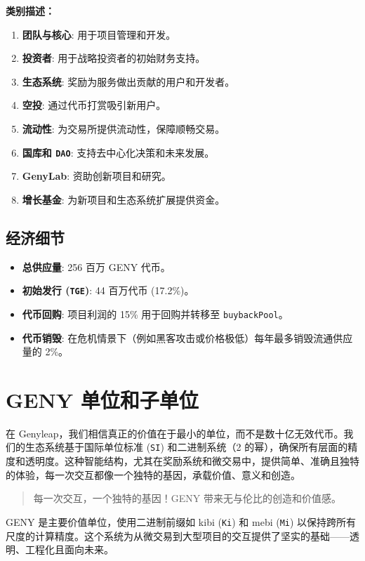 \documentclass[a4paper,12pt,openany]{book}
\begin{document}
\textbf{类别描述：}
\begin{enumerate}
    \item \textbf{团队与核心}: 用于项目管理和开发。
    \item \textbf{投资者}: 用于战略投资者的初始财务支持。
    \item \textbf{生态系统}: 奖励为服务做出贡献的用户和开发者。
    \item \textbf{空投}: 通过代币打赏吸引新用户。
    \item \textbf{流动性}: 为交易所提供流动性，保障顺畅交易。
    \item \textbf{国库和 \texttt{DAO}}: 支持去中心化决策和未来发展。
    \item \textbf{GenyLab}: 资助创新项目和研究。
    \item \textbf{增长基金}: 为新项目和生态系统扩展提供资金。
\end{enumerate}

\subsection*{经济细节}
\begin{itemize}
    \item \textbf{总供应量}: 256 百万 GENY 代币。
    \item \textbf{初始发行 (\texttt{TGE})}: 44 百万代币 (17.2\%)。
    \item \textbf{代币回购}: 项目利润的 15\% 用于回购并转移至 \texttt{buybackPool}。
    \item \textbf{代币销毁}: 在危机情景下（例如黑客攻击或价格极低）每年最多销毁流通供应量的 2\%。
\end{itemize}
\newpage

\section*{GENY 单位和子单位}
在 Genyleap，我们相信真正的价值在于最小的单位，而不是数十亿无效代币。我们的生态系统基于国际单位标准 (\texttt{SI}) 和二进制系统（2 的幂），确保所有层面的精度和透明度。这种智能结构，尤其在奖励系统和微交易中，提供简单、准确且独特的体验，每一次交互都像一个独特的基因，承载价值、意义和创造。
\begin{quote}
每一次交互，一个独特的基因！GENY 带来无与伦比的创造和价值感。
\end{quote}
GENY 是主要价值单位，使用二进制前缀如 kibi (\texttt{Ki}) 和 mebi (\texttt{Mi}) 以保持跨所有尺度的计算精度。这个系统为从微交易到大型项目的交互提供了坚实的基础——透明、工程化且面向未来。
\end{document}
